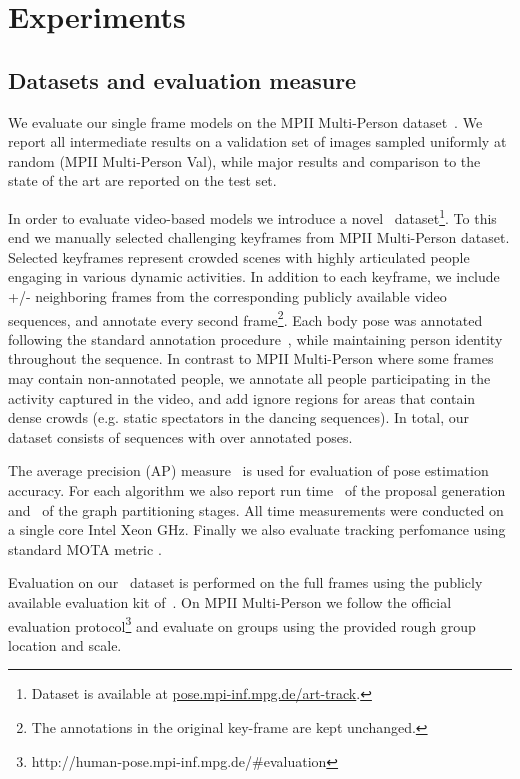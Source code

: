 \section{Experiments}
\label{seq:experiments}



\subsection{Datasets and evaluation measure}
 We evaluate our single frame models on
the MPII Multi-Person dataset~\cite{andriluka14cvpr}. 
We report all intermediate results on a validation set of  images
sampled uniformly at random (MPII Multi-Person Val), while major
results and comparison to the state of the art are reported on the
test set.

 In order to evaluate video-based models we
introduce a novel \videodata~dataset\footnote{Dataset is available at \url{pose.mpi-inf.mpg.de/art-track}.}.
 To this end we manually selected challenging
keyframes from MPII Multi-Person dataset. Selected
keyframes represent crowded scenes with highly articulated
people engaging in various dynamic activities. In addition to each
keyframe, we include +/- neighboring frames from the
corresponding publicly available video sequences, and annotate every
second frame\footnote{The annotations in the original key-frame are kept unchanged.}.
Each body pose was annotated following the standard annotation
procedure~\cite{andriluka14cvpr}, while maintaining person identity
throughout the sequence. In contrast to MPII Multi-Person where some
frames may contain non-annotated people, we annotate all people
participating in the activity captured in the video, and add ignore
regions for areas that contain dense crowds (e.g. static spectators in
the dancing sequences).  In total, our dataset consists of 
sequences with over  annotated poses.



The average precision (AP) measure~\cite{pishchulin16cvpr} is used for evaluation of pose estimation
accuracy. For each algorithm we also report run time \timecnn~of the proposal generation
and \timeinfer~of the graph partitioning stages. All time measurements were conducted on a single
core Intel Xeon GHz. Finally we also evaluate tracking perfomance using standard MOTA metric \cite{Bernardin:2008:CLE}.

Evaluation on our \videodata~dataset is performed on the full
frames using the publicly available evaluation kit
of~\cite{andriluka14cvpr}. On MPII Multi-Person we follow the official
evaluation
protocol\footnote{http://human-pose.mpi-inf.mpg.de/\#evaluation} and
evaluate on groups using the provided rough group location and scale.

